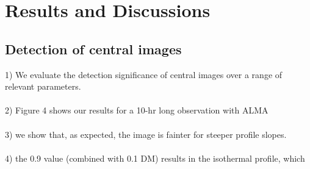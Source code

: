 \documentclass[chicago]{emulateapj}
\begin{document}
\begin{framed}
\end{framed}

\newpage
\section{Results and Discussions}
\begin{framed}
\subsection{Detection of central images}
1) We evaluate the detection significance of central images over a range of relevant parameters. \\ \\
2) Figure 4 shows our results for a 10-hr long observation with ALMA\\ \\
3) we show that, as expected, the image is fainter for steeper profile slopes. \\ \\
4) the 0.9 value (combined with 0.1 DM) results in the isothermal profile, which 
\end{framed}
\end{document}

